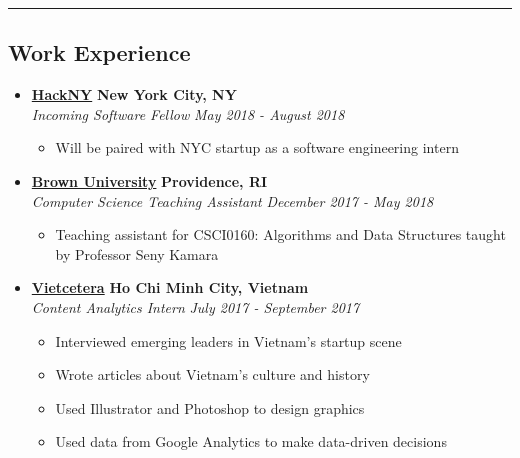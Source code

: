 \documentclass[10pt,letterpaper]{article}
\begin{document}
\hrule
\vspace{-1.0em}
\subsection*{Work Experience}
  \begin{itemize}
    \parskip=-0.5em

    \item[]
    {\href{http://www.twitter.com}{\textbf{HackNY}} \hfill
      \textbf{New York City, NY}}
    \\
    {\emph{Incoming Software Fellow} \hfill \emph{May 2018 - August 2018}}

    \begin{itemize}[label=\textbullet]
      \itemsep0em
      \item Will be paired with NYC startup as a software engineering intern
    \end{itemize}


    \item[]
    {\href{http://www.twitter.com}{\textbf{Brown University}} \hfill
      \textbf{Providence, RI}}
    \\
    {\emph{Computer Science Teaching Assistant} \hfill \emph{December 2017 - May 2018}}

    \begin{itemize}[label=\textbullet]
      \itemsep0em
      \item Teaching assistant for CSCI0160: Algorithms and Data Structures taught by Professor Seny Kamara
    \end{itemize}

    \item[]
    {\href{http://www.twitter.com}{\textbf{Vietcetera}} \hfill
      \textbf{Ho Chi Minh City, Vietnam}}
    \\
    {\emph{Content Analytics Intern} \hfill \emph{July 2017 - September 2017}}

    \begin{itemize}[label=\textbullet]
      \itemsep0em
      \item Interviewed emerging leaders in Vietnam's startup scene
      \item Wrote articles about Vietnam's culture and history
      \item Used Illustrator and Photoshop to design graphics
      \item Used data from Google Analytics to make data-driven decisions
    \end{itemize}


\end{itemize}
\end{document}
